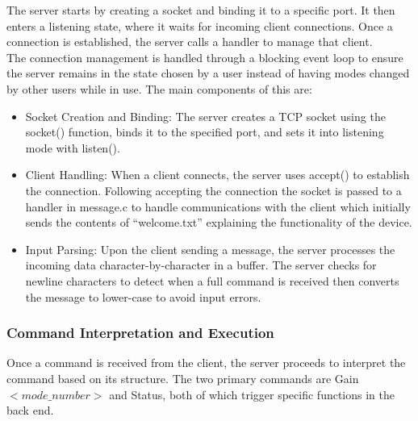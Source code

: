 \documentclass[conference]{IEEEtran}
\begin{document}
The server starts by creating a socket and binding it to a specific port. It then enters a listening state, where it waits for incoming client connections. Once a connection is established, the server calls a handler to manage that client.\\

The connection management is handled through a blocking event loop to ensure the server remains in the state chosen by a user instead of having modes changed by other users while in use. The main components of this are:\\

\begin{itemize}
    \item Socket Creation and Binding: The server creates a TCP socket using the socket() function, binds it to the specified port, and sets it into listening mode with listen().
    \item Client Handling: When a client connects, the server uses accept() to establish the connection. Following accepting the connection the socket is passed to a handler in message.c to handle communications with the client which initially sends the contents of “welcome.txt” explaining the functionality of the device.
    \item Input Parsing: Upon the client sending a message, the server processes the incoming data character-by-character in a buffer. The server checks for newline characters to detect when a full command is received then converts the message to lower-case to avoid input errors.\\
\end{itemize}


\subsubsection{Command Interpretation and Execution}

Once a command is received from the client, the server proceeds to interpret the command based on its structure. The two primary commands are Gain $<mode\_number>$ and Status, both of which trigger specific functions in the back end.\\
\end{document}
